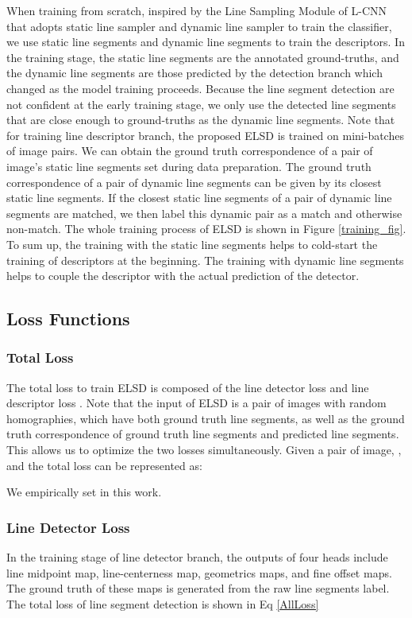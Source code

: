 \documentclass[10pt,twocolumn,letterpaper]{article}
\begin{document}
When training from scratch, inspired by the Line Sampling Module of L-CNN\cite{LCNN} that adopts static line sampler and dynamic line sampler to train the classifier, we use static line segments and dynamic line segments to train the descriptors. In the training stage, the static line segments are the annotated ground-truths, and the dynamic line segments are those predicted by the detection branch which changed as the model training proceeds. Because the line segment detection are not confident at the early training stage, we only use the detected line segments that are close enough to ground-truths as the dynamic line segments. 
Note that for training line descriptor branch, the proposed ELSD is trained on mini-batches of image pairs. We can obtain the ground truth correspondence of a pair of image's static line segments set during data preparation. The ground truth correspondence of a pair of dynamic line segments can be given by its closest static line segments. If the closest static line segments of a pair of dynamic line segments are matched, we then label this dynamic pair as a match and otherwise non-match. 
The whole training process of ELSD is shown in Figure \ref{training_fig}. 
To sum up, the training with the static line segments helps to cold-start the training of descriptors at the beginning. The training with dynamic line segments helps to couple the descriptor with the actual prediction of the detector.




\subsection{Loss Functions}
\subsubsection{Total Loss}
The total loss to train ELSD is composed of the line detector loss  and line descriptor loss . Note that the input of ELSD is a pair of images with random homographies, which have both ground truth line segments, as well as the ground truth correspondence of ground truth line segments and predicted line segments. This allows us to optimize the two losses simultaneously. Given a pair of image, , and the total loss can be represented as: 

We empirically set  in this work.
\subsubsection{Line Detector Loss}
In the training stage of line detector branch, the outputs of four heads include line midpoint map, line-centerness map, geometrics maps, and fine offset maps. The ground truth of these maps is generated from the raw line segments label. The total loss of line segment detection is shown in Eq \eqref{AllLoss}
\end{document}
